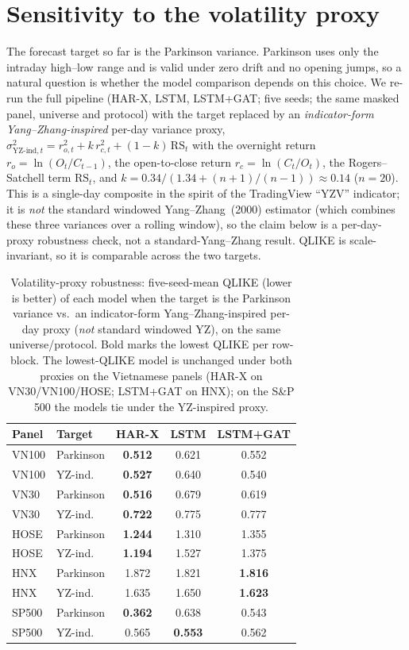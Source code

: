 \documentclass[runningheads]{llncs}
\begin{document}
\section{Sensitivity to the volatility proxy}\label{sec:proxy}
The forecast target so far is the Parkinson variance. Parkinson uses only the intraday high--low range and is
valid under zero drift and no opening jumps, so a natural question is whether the model comparison depends on
this choice. We re-run the full pipeline (HAR-X, LSTM, LSTM+GAT; five seeds; the same masked panel, universe and
protocol) with the target replaced by an \emph{indicator-form Yang--Zhang-inspired} per-day variance proxy,
$\sigma^2_{\mathrm{YZ\text{-}ind},t}=r_{o,t}^2+k\,r_{c,t}^2+(1-k)\,\mathrm{RS}_t$ with the overnight return
$r_o=\ln(O_t/C_{t-1})$, the open-to-close return $r_c=\ln(C_t/O_t)$, the Rogers--Satchell term $\mathrm{RS}_t$,
and $k=0.34/(1.34+(n{+}1)/(n{-}1))\approx0.14$ ($n{=}20$). This is a single-day composite in the spirit of the
TradingView ``YZV'' indicator; it is \emph{not} the standard windowed Yang--Zhang~(2000) estimator (which
combines these three variances over a rolling window), so the claim below is a per-day-proxy robustness check,
not a standard-Yang--Zhang result. QLIKE is scale-invariant, so it is comparable across the two targets.

\begin{table}[t]
\centering
\caption{Volatility-proxy robustness: five-seed-mean QLIKE (lower is better) of each model when the target is
the Parkinson variance vs.\ an indicator-form Yang--Zhang-inspired per-day proxy (\emph{not} standard windowed YZ), on the same universe/protocol. Bold marks the
lowest QLIKE per row-block. The lowest-QLIKE model is unchanged under both proxies on the Vietnamese panels (HAR-X on VN30/VN100/HOSE; LSTM+GAT on HNX);
on the S\&P 500 the models tie under the YZ-inspired proxy.}
\label{tab:proxy}
\footnotesize
\setlength{\tabcolsep}{6pt}
\begin{tabular}{llccc}
\toprule
Panel & Target & HAR-X & LSTM & LSTM+GAT \\
\midrule
VN100 & Parkinson & \textbf{0.512} & 0.621 & 0.552 \\
VN100 & YZ-ind. & \textbf{0.527} & 0.640 & 0.540 \\
\midrule
VN30 & Parkinson & \textbf{0.516} & 0.679 & 0.619 \\
VN30 & YZ-ind. & \textbf{0.722} & 0.775 & 0.777 \\
\midrule
HOSE & Parkinson & \textbf{1.244} & 1.310 & 1.355 \\
HOSE & YZ-ind. & \textbf{1.194} & 1.527 & 1.375 \\
\midrule
HNX & Parkinson & 1.872 & 1.821 & \textbf{1.816} \\
HNX & YZ-ind. & 1.635 & 1.650 & \textbf{1.623} \\
\midrule
SP500 & Parkinson & \textbf{0.362} & 0.638 & 0.543 \\
SP500 & YZ-ind. & 0.565 & \textbf{0.553} & 0.562 \\
\bottomrule
\end{tabular}
\end{table}
\end{document}
